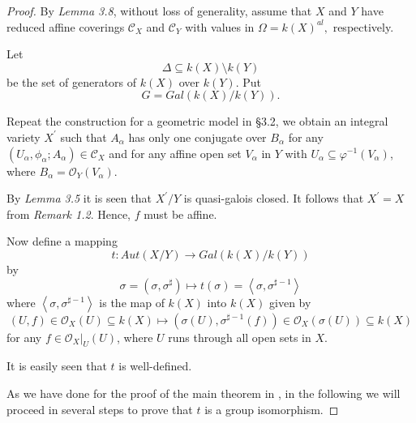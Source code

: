 \documentclass[12pt,twoside,reqno]{amsart}
\theoremstyle{definition}
\numberwithin{equation}{section}
\begin{document}
\begin{proof}
By \emph{Lemma 3.8}, without loss of generality, assume that $X$ and $Y$
have reduced affine coverings $\mathcal{C}_{X}$ and $\mathcal{C}_{Y}$ with
values in $\Omega =k\left( X\right) ^{al},$ respectively.

Let $$\Delta \subseteq k\left( X\right) \setminus k\left( Y\right) $$ be the
set of generators of $k\left( X\right) $ over $k\left( Y\right) .$ Put $$
G=Gal\left( k\left( X\right) /k\left( Y\right) \right) .$$

Repeat the construction for a geometric model in \S 3.2, we obtain an
integral variety $X^{\prime }$ such that $A_{\alpha }$ has only one
conjugate over $B_{\alpha }$ for any $(U_{\alpha },\phi _{\alpha };A_{\alpha
})\in \mathcal{C}_{X}$ and for any affine open set $V_{\alpha }$ in $Y$ with
$U_{\alpha }\subseteq \varphi ^{-1}(V_{\alpha })$, where $B_{\alpha }=\mathcal{O}_{Y}(V_{\alpha })$.

By \emph{Lemma 3.5} it is seen that $X^{\prime }/Y$ is quasi-galois closed.
It follows that $X^{\prime }=X$ from \emph{Remark 1.2}. Hence, $f$ must be
affine.

Now define a mapping
\begin{equation*}
t:Aut\left( X/Y\right) \longrightarrow Gal\left( k\left( X\right) /k\left(
Y\right) \right)
\end{equation*}by
\begin{equation*}
\sigma =(\sigma ,\sigma ^{\sharp })\longmapsto t(\sigma )=\left\langle
\sigma ,\sigma ^{\sharp -1}\right\rangle
\end{equation*}where $\left\langle \sigma ,\sigma ^{\sharp -1}\right\rangle $ is the map of
$k(X)$ into $k(X)$ given by
\begin{equation*}
\left( U,f\right) \in \mathcal{O}_{X}(U)\subseteq k\left( X\right)
\longmapsto \left( \sigma \left( U\right) ,\sigma ^{\sharp -1}\left(
f\right) \right) \in \mathcal{O}_{X}(\sigma (U))\subseteq k\left( X\right)
\end{equation*}for any $f\in \mathcal{O}_{X}|_{U}(U)$, where $U$ runs through all open sets
in $X.$

It is easily seen that $t$ is well-defined.

As we have done for the proof of the main theorem in \cite{An2}, in the
following we will proceed in several steps to prove that $t$ is a group
isomorphism.


\end{proof}
\end{document}
